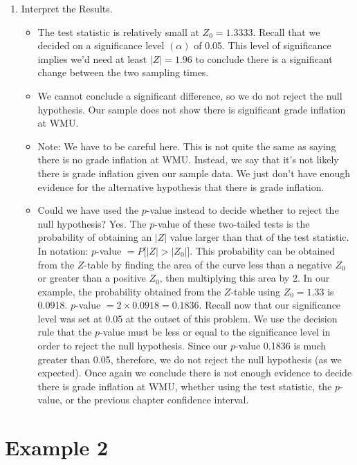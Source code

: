 \documentclass[11pt, chapterprefix=true]{scrbook}\usepackage[]{graphicx}\usepackage[]{color}
\begin{document}
\begin{enumerate}
\item Interpret the Results.

\begin{itemize}
\item The test statistic is relatively small at $Z_0 = 1.3333$.  Recall that we decided on a significance level $(\alpha)$ of 0.05. This level of significance implies we’d need at least $|Z| = 1.96$ to conclude there is a significant change between the two sampling times.

\item We cannot conclude a significant difference, so we do not reject the null hypothesis. Our sample does not show there is significant grade inflation at WMU.

\item Note: We have to be careful here. This is not quite the same as saying there is no grade inflation at WMU. Instead, we say that it’s not likely there is grade inflation given our sample data. We just don’t have enough evidence for the alternative hypothesis that there is grade inflation.

\item Could we have used the $p$-value instead to decide whether to reject the null hypothesis? Yes. The $p$-value of these two-tailed tests is the probability of obtaining an $|Z|$ value larger than that of the test statistic.  In notation: 
$p$-value $ = P[ |Z| > |Z_0|$].  This probability can be obtained from the $Z$-table by finding the area of the curve less than a negative $Z_0$ or greater than a positive $Z_0$, then multiplying this area by 2. In our example, the probability obtained from the $Z$-table using $Z_0 = 1.33$ is 0.0918.  $p$-value $= 2 \times 0.0918 = 0.1836$. Recall now that our significance level was set at 0.05 at the outset of this problem.  We use the decision rule that the $p$-value must be less or equal to the significance level in order to reject the null hypothesis. 
Since our $p$-value 0.1836 is much greater than 0.05, therefore, we do not reject the null hypothesis (as we expected). Once again we conclude there is not enough evidence to decide there is grade inflation at WMU, whether using the test statistic, the $p$-value, or the previous chapter confidence interval.

\end{itemize}

\end{enumerate}

\section{Example 2}
\end{document}

